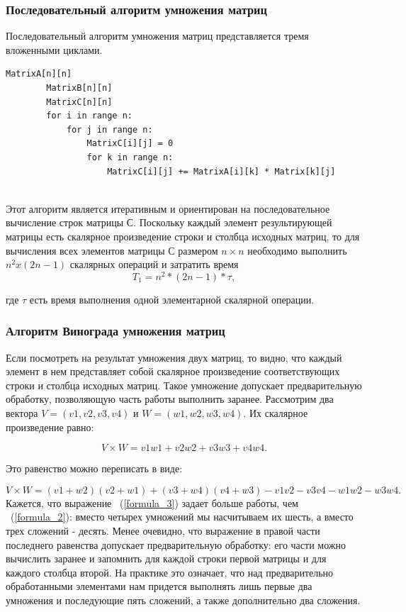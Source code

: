 \documentclass[a4paper]{article}
\begin{document}
	\subsubsection{Последовательный алгоритм умножения матриц}
	Последовательный алгоритм умножения матриц представляется тремя вложенными циклами. 
	\begin{lstlisting}[caption = Последовательный алгоритм умножения матриц]
		MatrixA[n][n]
		MatrixB[n][n]
		MatrixC[n][n]
		for i in range n:
			for j in range n:	
				MatrixC[i][j] = 0
				for k in range n:
					MatrixC[i][j] += MatrixA[i][k] * Matrix[k][j]
		
	\end{lstlisting}
	Этот алгоритм является итеративным и ориентирован на последовательное вычисление строк матрицы С.
	Поскольку каждый элемент результирующей матрицы есть скалярное произведение строки и столбца исходных матриц, то для вычисления всех элементов матрицы  С  размером $n \times n$ необходимо выполнить $n^2x(2n - 1)$ скалярных операций и затратить время
	\begin{equation}
		T_1 = n^2 * (2n-1) * \tau  ,
		\label{time_1}
	\end{equation}

	где $\tau$ есть время выполнения одной элементарной скалярной операции.
	
	\subsubsection{Алгоритм Винограда умножения матриц}
	 Если посмотреть на результат умножения двух матриц, то видно, что каждый элемент в нем представляет собой скалярное произведение соответствующих строки и столбца исходных матриц.
	 Такое умножение допускает предварительную обработку, позволяющую часть работы выполнить заранее.
	 Рассмотрим два вектора $V = (v1, v2, v3, v4)$ и $W = (w1, w2, w3, w4)$. Их скалярное произведение равно:
	 
	 \begin{equation}
	 	V \times W = v1w1 + v2w2 + v3w3 + v4w4.
	 \label{formula_2}
	 \end{equation}
	 
	 Это равенство можно переписать в виде:
	 
	 \begin{equation}
	 	V \times W = (v1 + w2)(v2 + w1) + (v3 + w4)(v4 + w3) - v1v2 - v3v4 - w1w2 - w3w4.
	 \label{formula_3}
	 \end{equation}
 	Кажется, что выражение ~(\ref{formula_3}) задает больше работы, чем ~(\ref{formula_2}): вместо четырех умножений мы насчитываем их шесть, а вместо трех сложений - десять. Менее очевидно, что выражение в правой части последнего равенства допускает предварительную обработку: его части можно вычислить заранее и запомнить для каждой строки первой матрицы и для каждого столбца второй. На практике это означает, что над предварительно обработанными элементами нам придется выполнять лишь первые два умножения и последующие пять сложений, а также дополнительно два сложения.
 	
\end{document}
